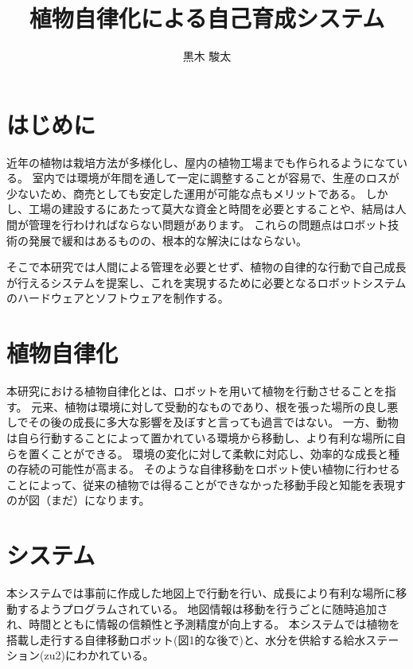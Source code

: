 \documentclass[10pt]{jsarticle}
\begin{document}
\pagestyle{empty}

\setlength{\baselineskip}{13truept}

\title{植物自律化による自己育成システム}
\author{黒木 駿太}

\maketitle
\thispagestyle{empty}

\section{はじめに}
近年の植物は栽培方法が多様化し、屋内の植物工場までも作られるようになている。
室内では環境が年間を通して一定に調整することが容易で、生産のロスが少ないため、商売としても安定した運用が可能な点もメリットである。
しかし、工場の建設するにあたって莫大な資金と時間を必要とすることや、結局は人間が管理を行わければならない問題があります。
これらの問題点はロボット技術の発展で緩和はあるものの、根本的な解決にはならない。

そこで本研究では人間による管理を必要とせず、植物の自律的な行動で自己成長が行えるシステムを提案し、これを実現するために必要となるロボットシステムのハードウェアとソフトウェアを制作する。

\section{植物自律化}
本研究における植物自律化とは、ロボットを用いて植物を行動させることを指す。
元来、植物は環境に対して受動的なものであり、根を張った場所の良し悪しでその後の成長に多大な影響を及ぼすと言っても過言ではない。
一方、動物は自ら行動することによって置かれている環境から移動し、より有利な場所に自らを置くことができる。
環境の変化に対して柔軟に対応し、効率的な成長と種の存続の可能性が高まる。
そのような自律移動をロボット使い植物に行わせることによって、従来の植物では得ることができなかった移動手段と知能を表現すのが図（まだ）になります。

\section{システム}
本システムでは事前に作成した地図上で行動を行い、成長により有利な場所に移動するようプログラムされている。
地図情報は移動を行うごとに随時追加され、時間とともに情報の信頼性と予測精度が向上する。
本システムでは植物を搭載し走行する自律移動ロボット(図1的な後で)と、水分を供給する給水ステーション(zu2)にわかれている。
\end{document}
